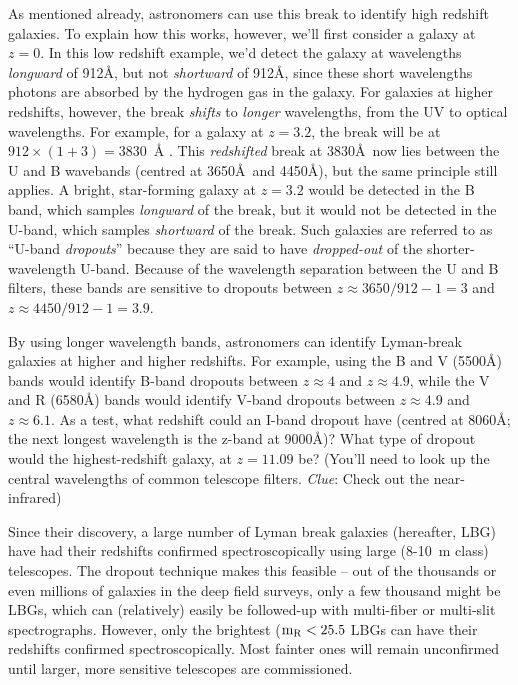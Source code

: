 \documentclass[11pt]{article}
\begin{document}
As mentioned already, astronomers can use this break to identify high
redshift galaxies. To explain how this works, however, we'll first
consider a galaxy at $z=0$. In this low redshift example, we'd detect
the galaxy at wavelengths {\it longward} of 912\AA, but not {\it
  shortward} of 912\AA , since these short wavelengths photons are
absorbed by the hydrogen gas in the galaxy. For galaxies at higher
redshifts, however, the break {\it shifts} to {\it longer}
wavelengths, from the UV to optical wavelengths. For example, for a
galaxy at $z=3.2$, the break will be at $912\times(1+3)=3830$~\AA
. This {\it redshifted} break at 3830\AA\ now lies between the U and B
wavebands (centred at 3650\AA\ and 4450\AA ), but the same principle
still applies. A bright, star-forming galaxy at $z=3.2$ would be
detected in the B band, which samples {\it longward} of the break, but
it would not be detected in the U-band, which samples {\it shortward}
of the break. Such galaxies are referred to as ``U-band {\it
  dropouts}'' because they are said to have {\it dropped-out} of the
shorter-wavelength U-band. Because of the wavelength separation
between the U and B filters, these bands are sensitive to dropouts
between $z\approx3650/912-1=3$ and $z\approx4450/912-1=3.9$.

By using longer wavelength bands, astronomers can identify Lyman-break
galaxies at higher and higher redshifts. For example, using the B and
V (5500\AA ) bands would identify B-band dropouts between $z\approx4$
and $z\approx4.9$, while the V and R (6580\AA ) bands would identify
V-band dropouts between $z\approx4.9$ and $z\approx6.1$. As a test,
what redshift could an I-band dropout have (centred at 8060\AA ; the
next longest wavelength is the z-band at 9000\AA )? What type of
dropout would the highest-redshift galaxy, at $z=11.09$ be? (You'll
need to look up the central wavelengths of common telescope
filters. {\it Clue}: Check out the near-infrared)

Since their discovery, a large number of Lyman break galaxies
(hereafter, LBG) have had their redshifts confirmed spectroscopically
using large (8-10~m class) telescopes. The dropout technique makes
this feasible -- out of the thousands or even millions of galaxies in
the deep field surveys, only a few thousand might be LBGs, which can
(relatively) easily be followed-up with multi-fiber or multi-slit
spectrographs. However, only the brightest (${\rm m_R < 25.5}$ LBGs
can have their redshifts confirmed spectroscopically. Most fainter
ones will remain unconfirmed until larger, more sensitive telescopes
are commissioned.
\end{document}
